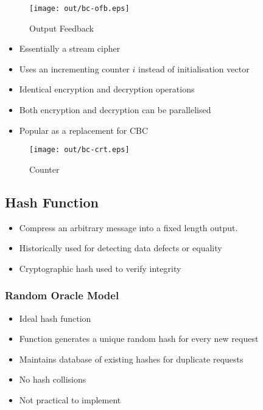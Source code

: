 \documentclass[a4paper]{article}
\begin{document}
\begin{figure}[h!]
  \centering
  \texttt{[image: out/bc-ofb.eps]}
  \caption{Output Feedback}
  \label{fig:bc-ofc}
\end{figure}
\FloatBarrier


\begin{itemize}
  \item Essentially a stream cipher
  \item Uses an incrementing counter $i$ instead of initialisation vector
  \item Identical encryption and decryption operations
  \item Both encryption and decryption can be parallelised
  \item Popular as a replacement for CBC
\end{itemize}

\begin{figure}[h!]
  \centering
  \texttt{[image: out/bc-crt.eps]}
  \caption{Counter}
  \label{fig:bc-crt}
\end{figure}
\FloatBarrier

\subsection{Hash Function}

\begin{itemize}
  \item Compress an arbitrary message into a fixed length output.
  \item Historically used for detecting data defects or equality
  \item Cryptographic hash used to verify integrity
\end{itemize}

\subsubsection{Random Oracle Model}

\begin{itemize}
  \item Ideal hash function
  \item Function generates a unique random hash for every new request
  \item Maintains database of existing hashes for duplicate requests
  \item No hash collisions
  \item Not practical to implement
\end{itemize}
\end{document}
